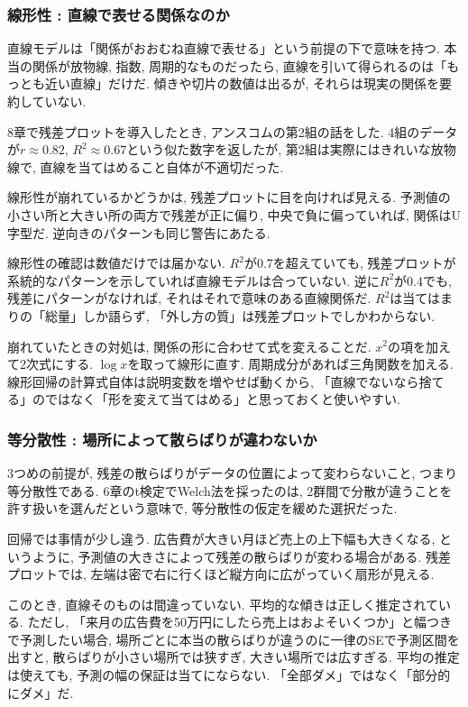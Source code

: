 \subsubsection*{線形性 : 直線で表せる関係なのか}

直線モデルは「関係がおおむね直線で表せる」という前提の下で意味を持つ.
本当の関係が放物線, 指数, 周期的なものだったら, 直線を引いて得られるのは「もっとも近い直線」だけだ.
傾きや切片の数値は出るが, それらは現実の関係を要約していない.

8章で残差プロットを導入したとき, アンスコムの第2組の話をした.
4組のデータが$r \approx 0.82$, $R^2 \approx 0.67$という似た数字を返したが, 第2組は実際にはきれいな放物線で, 直線を当てはめること自体が不適切だった.

線形性が崩れているかどうかは, 残差プロットに目を向ければ見える.
予測値の小さい所と大きい所の両方で残差が正に偏り, 中央で負に偏っていれば, 関係はU字型だ.
逆向きのパターンも同じ警告にあたる.

線形性の確認は数値だけでは届かない.
$R^2$が0.7を超えていても, 残差プロットが系統的なパターンを示していれば直線モデルは合っていない.
逆に$R^2$が0.4でも, 残差にパターンがなければ, それはそれで意味のある直線関係だ.
$R^2$は当てはまりの「総量」しか語らず, 「外し方の質」は残差プロットでしかわからない.

崩れていたときの対処は, 関係の形に合わせて式を変えることだ.
$x^2$の項を加えて2次式にする. $\log x$を取って線形に直す. 周期成分があれば三角関数を加える.
線形回帰の計算式自体は説明変数を増やせば動くから, 「直線でないなら捨てる」のではなく「形を変えて当てはめる」と思っておくと使いやすい.

\subsubsection*{等分散性 : 場所によって散らばりが違わないか}

3つめの前提が, 残差の散らばりがデータの位置によって変わらないこと, つまり等分散性である.
6章のt検定でWelch法を採ったのは, 2群間で分散が違うことを許す扱いを選んだという意味で, 等分散性の仮定を緩めた選択だった.

回帰では事情が少し違う.
広告費が大きい月ほど売上の上下幅も大きくなる, というように, 予測値の大きさによって残差の散らばりが変わる場合がある.
残差プロットでは, 左端は密で右に行くほど縦方向に広がっていく扇形が見える.

このとき, 直線そのものは間違っていない.
平均的な傾きは正しく推定されている.
ただし, 「来月の広告費を50万円にしたら売上はおよそいくつか」と幅つきで予測したい場合, 場所ごとに本当の散らばりが違うのに一律のSEで予測区間を出すと, 散らばりが小さい場所では狭すぎ, 大きい場所では広すぎる.
平均の推定は使えても, 予測の幅の保証は当てにならない. 「全部ダメ」ではなく「部分的にダメ」だ.

